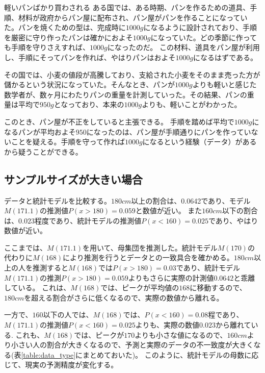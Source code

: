 \begin{SMbox}{軽いパンばかり買わされる}
ある国では、ある時期、パンを作るための道具、手順、材料が政府からパン屋に配布され、パン屋がパンを作ることになっていた。パンを焼くための型は、完成時に$1000g$になるように設計されており、手順を厳密に守り作ったパンは確かにおよそ$1000g$になっていた。どの季節に作っても手順を守りさえすれば、$1000g$になったのだ。
この材料、道具をパン屋が利用し、手順にそってパンを作れば、やはりパンはおよそ$1000g$になるはずである。

その国では、小麦の値段が高騰しており、支給された小麦をそのまま売った方が儲かるという状況になっていた。そんなとき、パンが$1000g$よりも軽いと感じた数学者が、数ヶ月にわたりパンの重量を計測していった。その結果、パンの重量は平均で$950g$となっており、本来の$1000g$よりも、軽いことがわかった。

このとき、パン屋が不正をしていると主張できる。
手順を踏めば平均で$1000g$になるパンが平均およそ$950$になったのは、パン屋が手順通りにパンを作っていないことを疑える。手順を守って作れば$1000g$になるという経験（データ）があるから疑うことができる。
\end{SMbox}


\subsection{サンプルサイズが大きい場合}

データと統計モデルを比較する。$180cm$以上の割合は、0.0642であり、モデル$M(171.1)$の推測値$P(x>180)=0.059$と数値が近い。
また$160cm$以下の割合は、$0.023$程度であり、統計モデルの推測値$P(x<160)=0.025$であり、やはり数値が近い。

ここまでは、$M(171.1)$を用いて、母集団を推測した。統計モデル$M(170)$の代わりに$M(168)$により推測を行うとデータとの一致具合を確かめる。$180cm$以上の人を推測すると$M(168)$では$P(x>180)=0.03$であり、統計モデル$M(171.1)$の推測$P(x>180)=0.059$よりもさらに実際の計測値$0.0642$と乖離している。
これは、$M(168)$では、ピークが平均値の$168$に移動するので、$180cm$を超える割合がさらに低くなるので、実際の数値から離れる。

一方で、$160$以下の人では、$M(168)$では、$P(x<160)=0.08$程であり、$M(171.1)$の推測値$P(x<160)=0.025$よりも、実際の数値$0.023$から離れている.
これも、$M(168)$では、ピークが$170$よりも小さな値になるので、$160cm$より小さい人の割合が大きくなるので、予測と実際のデータの不一致度が大きくなる(表\ref{table:data_type}にまとめておいた)。
このように、統計モデルの母数に応じて、現実の予測精度が変化する。

